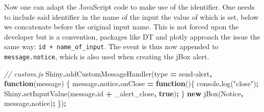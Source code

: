 \documentclass[
]{krantz}
\makeatletter
\newenvironment{Shaded}{\begin{snugshade}}{\end{snugshade}}
\newcommand{\AttributeTok}[1]{\textcolor[rgb]{0.61,0.61,0.61}{#1}}
\newcommand{\BuiltInTok}[1]{#1}
\newcommand{\CommentTok}[1]{\textcolor[rgb]{0.37,0.37,0.37}{\textit{#1}}}
\newcommand{\ControlFlowTok}[1]{\textcolor[rgb]{0.27,0.27,0.27}{\textbf{#1}}}
\newcommand{\DataTypeTok}[1]{\textcolor[rgb]{0.27,0.27,0.27}{#1}}
\newcommand{\FunctionTok}[1]{\textcolor[rgb]{0,0,0}{#1}}
\newcommand{\KeywordTok}[1]{\textcolor[rgb]{0.27,0.27,0.27}{\textbf{#1}}}
\newcommand{\NormalTok}[1]{#1}
\newcommand{\OperatorTok}[1]{\textcolor[rgb]{0.43,0.43,0.43}{\textbf{#1}}}
\newcommand{\StringTok}[1]{\textcolor[rgb]{0.5,0.5,0.5}{#1}}
\newenvironment{kframe}{%
\medskip{}
\setlength{\fboxsep}{.8em}
 \def\at@end@of@kframe{}%
 \ifinner\ifhmode%
  \def\at@end@of@kframe{\end{minipage}}%
  \begin{minipage}{\columnwidth}%
 \fi\fi%
 \def\FrameCommand##1{\hskip\@totalleftmargin \hskip-\fboxsep
 \colorbox{shadecolor}{##1}\hskip-\fboxsep
     \hskip-\linewidth \hskip-\@totalleftmargin \hskip\columnwidth}%
 \MakeFramed {\advance\hsize-\width
   \@totalleftmargin\z@ \linewidth\hsize
   \@setminipage}}%
 {\par\unskip\endMakeFramed%
 \at@end@of@kframe}
\renewenvironment{Shaded}{\begin{kframe}}{\end{kframe}}
\makeatother
\begin{document}
\begin{Shaded}
\end{Shaded}

Now one can adapt the JavaScript code to make use of the identifier. One needs to include said identifier in the name of the input the value of which is set, below we concatenate before the original input name. This is not forced upon the developer but is a convention, packages like DT and plotly approach the issue the same way: \texttt{id\ +\ name\_of\_input}. The event is thus now appended to \texttt{message.notice}, which is also used when creating the jBox alert.

\begin{Shaded}
\begin{Highlighting}[]
\CommentTok{// custom.js}
\NormalTok{Shiny}\OperatorTok{.}\FunctionTok{addCustomMessageHandler}\NormalTok{(type }\OperatorTok{=} \StringTok{\textquotesingle{}send{-}alert\textquotesingle{}}\OperatorTok{,} \KeywordTok{function}\NormalTok{(message) \{}
\NormalTok{  message}\OperatorTok{.}\AttributeTok{notice}\OperatorTok{.}\AttributeTok{onClose} \OperatorTok{=} \KeywordTok{function}\NormalTok{()\{}
    \BuiltInTok{console}\OperatorTok{.}\FunctionTok{log}\NormalTok{(}\StringTok{"close"}\NormalTok{)}\OperatorTok{;}
\NormalTok{    Shiny}\OperatorTok{.}\FunctionTok{setInputValue}\NormalTok{(message}\OperatorTok{.}\AttributeTok{id} \OperatorTok{+} \StringTok{\textquotesingle{}\_alert\_close\textquotesingle{}}\OperatorTok{,} \KeywordTok{true}\NormalTok{)}\OperatorTok{;}
\NormalTok{  \}}
  \KeywordTok{new}\NormalTok{ jBox(}\StringTok{\textquotesingle{}Notice\textquotesingle{}}\OperatorTok{,}\NormalTok{ message}\OperatorTok{.}\AttributeTok{notice}\NormalTok{)}\OperatorTok{;}
\NormalTok{\})}\OperatorTok{;}
\end{Highlighting}
\end{Shaded}
\end{document}
